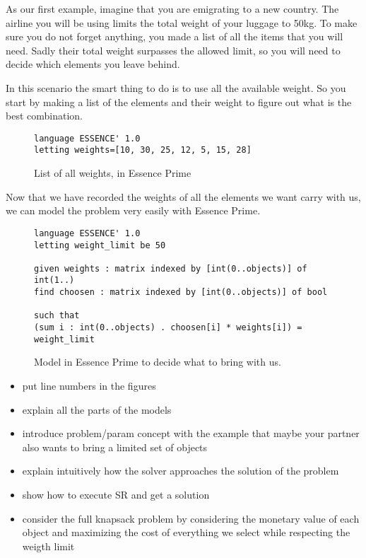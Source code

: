 As our first example, imagine that you are emigrating to a new country. The
airline you will be using limits the total weight of your luggage to 50kg.
To make sure you do not forget anything, you made a list of all the items that
you will need.  Sadly their total weight surpasses the allowed limit, so you
will need to decide which elements you leave behind.

In this scenario the smart thing to do is to use all the available weight. So you
start by making a list of the elements and their weight to figure out what is the
best combination.

\begin{figure}
\begin{lstlisting}
language ESSENCE' 1.0
letting weights=[10, 30, 25, 12, 5, 15, 28]
\end{lstlisting}
\caption{List of all weights, in Essence Prime}
\label{fig-knapsack1param}
\end{figure}

Now that we have recorded the weights of all the elements we want carry with us,
we can model the problem very easily with Essence Prime.

\begin{figure}
\begin{lstlisting}
language ESSENCE' 1.0
letting weight_limit be 50

given weights : matrix indexed by [int(0..objects)] of int(1..)
find choosen : matrix indexed by [int(0..objects)] of bool

such that
(sum i : int(0..objects) . choosen[i] * weights[i]) = weight_limit
\end{lstlisting}
\caption{Model in Essence Prime to decide what to bring with us.}
\label{fig-knapsack1}
\end{figure}

\begin{itemize}
\item put line numbers in the figures
\item explain all the parts of the models
\item introduce problem/param concept with the example that maybe your partner also 
wants to bring a limited set of objects
\item explain intuitively how the solver approaches the solution of the problem
\item show how to execute SR and get a solution
\item consider the full knapsack problem by considering the monetary value of each object
and maximizing the cost of everything we select while respecting the weigth limit
\end{itemize}

